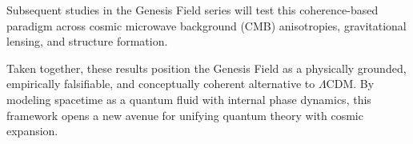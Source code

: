 Subsequent studies in the Genesis Field series will test this coherence-based paradigm across cosmic microwave background (CMB) anisotropies, gravitational lensing, and structure formation.

Taken together, these results position the Genesis Field as a physically grounded, empirically falsifiable, and conceptually coherent alternative to \(\Lambda\)CDM. By modeling spacetime as a quantum fluid with internal phase dynamics, this framework opens a new avenue for unifying quantum theory with cosmic expansion.
